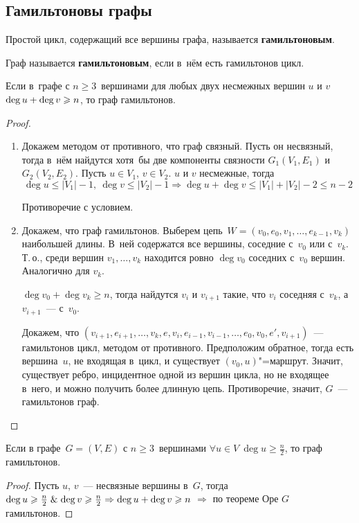 \subsection{Гамильтоновы графы}
Простой цикл, содержащий все вершины графа, называется \textbf{гамильтоновым}.

 Граф называется \textbf{гамильтоновым}, если в~нём есть гамильтонов цикл.

\begin{theorem}[Оре]
Если в~графе с $n \geqslant 3$~вершинами для любых двух несмежных вершин $u$ и $v$ $\deg u \opbr+ \deg v \opbr\geqslant n$, то граф гамильтонов.
\end{theorem}
\begin{proof}
\begin{enumerate}
	\item Докажем методом от противного, что граф связный.
	Пусть он несвязный, тогда в~нём найдутся хотя~бы две компоненты связности $G_1(V_1, E_1)$ и $G_2(V_2, E_2)$.
	Пусть $u \in V_1$, $v \in V_2$.
	$u$ и $v$ несмежные, тогда
	\begin{equation*}
	\deg u \leqslant |V_1| - 1, \ \deg v \leqslant |V_2| - 1 \Rightarrow \deg u + \deg v \leqslant |V_1| + |V_2| - 2 \leqslant n - 2
	\end{equation*}
	
	Противоречие с условием.
	
	\item Докажем, что граф гамильтонов.
	Выберем цепь~$W = (v_0, e_0, v_1, \ldots, e_{k-1}, v_k)$ наибольшей длины.
	В~ней содержатся все вершины, соседние с~$v_0$ или с~$v_k$.
	Т.\,о., среди вершин $v_1, \ldots, v_k$ находится ровно $\deg v_0$ соседних с~$v_0$ вершин.
	Аналогично для $v_k$.
	
	$\deg v_0 + \deg v_k \geqslant n$, тогда найдутся $v_i$ и $v_{i+1}$ такие, что $v_i$ соседняя с~$v_k$, а $v_{i+1}$~--- с~$v_0$.
	
	Докажем, что $(v_{i+1}, e_{i+1}, \ldots, v_k, e, v_i, e_{i-1}, v_{i-1}, \ldots, e_0, v_0, e', v_{i+1})$~--- гамильтонов цикл, методом от противного.
	Предположим обратное, тогда есть вершина~$u$, не входящая в~цикл, и существует $(v_0, u)$"=маршрут.
	Значит, существует ребро, инцидентное одной из вершин цикла, но не входящее в~него, и можно получить более длинную цепь.
	Противоречие, значит, $G$~--- гамильтонов граф.
\end{enumerate}
\end{proof}

\begin{theorem}[Дирака]
\label{th:Dirac}
Если в графе~$G = (V, E)$ с $n \geqslant 3$~вершинами $\forall u \in V \ \deg u \geqslant \frac{n}2$, то граф гамильтонов.
\end{theorem}
\begin{proof}
Пусть $u$, $v$~--- несвязные вершины в~$G$, тогда $\deg u \geqslant \frac{n}2 \mathrel{\&} \deg v \geqslant \frac{n}2 \Rightarrow \deg u + \deg v \geqslant n$ $\Rightarrow$ по теореме Оре $G$ гамильтонов.
\end{proof}

